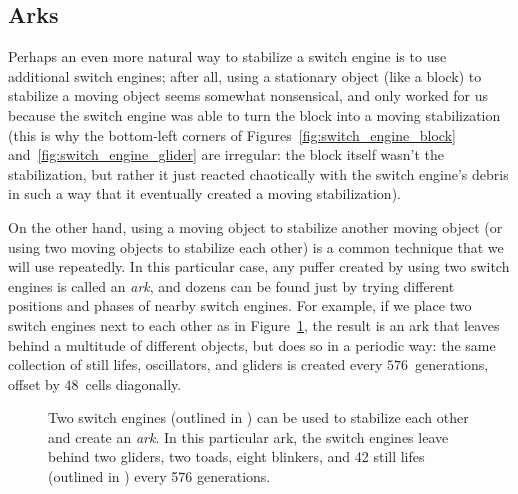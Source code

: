 \subsection{Arks}\label{sec:arks}

Perhaps an even more natural way to stabilize a switch engine is to use additional switch engines; after all, using a stationary object (like a block) to stabilize a moving object seems somewhat nonsensical, and only worked for us because the switch engine was able to turn the block into a moving stabilization (this is why the bottom-left corners of Figures~\ref{fig:switch_engine_block} and~\ref{fig:switch_engine_glider} are irregular: the block itself wasn't the stabilization, but rather it just reacted chaotically with the switch engine's debris in such a way that it eventually created a moving stabilization).

On the other hand, using a moving object to stabilize another moving object (or using two moving objects to stabilize each other) is a common technique that we will use repeatedly. In this particular case, any puffer created by using two switch engines is called an \emph{ark}, and dozens can be found just by trying different positions and phases of nearby switch engines. For example, if we place two switch engines next to each other as in Figure~\ref{fig:ark_1}, the result is an ark that leaves behind a multitude of different objects, but does so in a periodic way: the same collection of still lifes, oscillators, and gliders is created every $576$~generations, offset by $48$~cells diagonally.

\begin{figure}[!htb]
	\centering{}
	\caption{Two switch engines (outlined in ) can be used to stabilize each other and create an \emph{ark}. In this particular ark, the switch engines leave behind two gliders, two toads, eight blinkers, and 42 still lifes (outlined in ) every 576 generations.}\label{fig:ark_1}
\end{figure}


